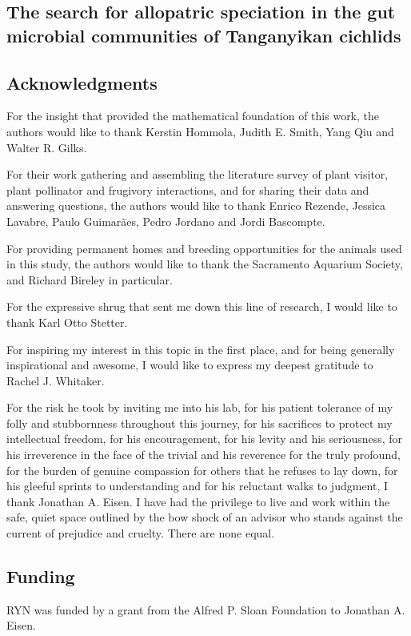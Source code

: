 \begin{refsection}

\chapter{The search for allopatric speciation in the gut microbial communities of Tanganyikan cichlids}







\section{Acknowledgments}

For the insight that provided the mathematical foundation of this work, the authors would like to thank Kerstin Hommola, Judith E. Smith, Yang Qiu and Walter R. Gilks.

For their work gathering and assembling the literature survey of plant visitor, plant pollinator and frugivory interactions, and for sharing their data and answering questions, the authors would like to thank Enrico Rezende, Jessica Lavabre, Paulo Guimar{\~a}es, Pedro Jordano and Jordi Bascompte.

For providing permanent homes and breeding opportunities for the animals used in this study, the authors would like to thank the Sacramento Aquarium Society, and Richard Bireley in particular.

For the expressive shrug that sent me down this line of research, I would like to thank Karl Otto Stetter.

For inspiring my interest in this topic in the first place, and for being generally inspirational and awesome, I would like to express my deepest gratitude to Rachel J. Whitaker.

For the risk he took by inviting me into his lab, for his patient tolerance of my folly and stubbornness throughout this journey, for his sacrifices to protect my intellectual freedom, for his encouragement, for his levity and his seriousness, for his irreverence in the face of the trivial and his reverence for the truly profound, for the burden of genuine compassion for others that he refuses to lay down, for his gleeful sprints to understanding and for his reluctant walks to judgment, I thank Jonathan A. Eisen. I have had the privilege to live and work within the safe, quiet space outlined by the bow shock of an advisor who stands against the current of prejudice and cruelty. There are none equal.


\section{Funding}

RYN was funded by a grant from the Alfred P. Sloan Foundation to Jonathan A. Eisen. 

\printbibliography[heading=subbibliography]

\end{refsection}